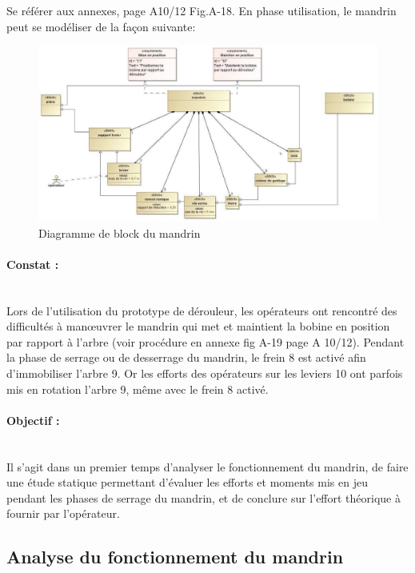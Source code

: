 Se référer aux annexes, page A10/12 Fig.A-18. En phase utilisation, le mandrin peut se modéliser de la façon suivante:
\begin{figure}[!h]
 \centering\includegraphics[width=0.9\linewidth]{img/fig12}
 \caption{Diagramme de block du mandrin}
 \label{fig12}
\end{figure}

\paragraph{Constat : } ~\ \\
Lors de l'utilisation du prototype de dérouleur, les opérateurs ont rencontré des difficultés à
man\oe uvrer le mandrin qui met et maintient la bobine en position par rapport à l'arbre (voir
procédure en annexe fig A-19 page A 10/12). Pendant la phase de serrage ou de desserrage
du mandrin, le frein 8 est activé afin d'immobiliser l'arbre 9. Or les efforts des opérateurs sur les
leviers 10 ont parfois mis en rotation l'arbre 9, même avec le frein 8 activé.

\paragraph{Objectif :} ~\ \\
Il s'agit dans un premier temps d'analyser le fonctionnement du mandrin, de faire une étude
statique permettant d'évaluer les efforts et moments mis en jeu pendant les phases de serrage
du mandrin, et de conclure sur l'effort théorique à fournir par l'opérateur.

\subsection{Analyse du fonctionnement du mandrin}


